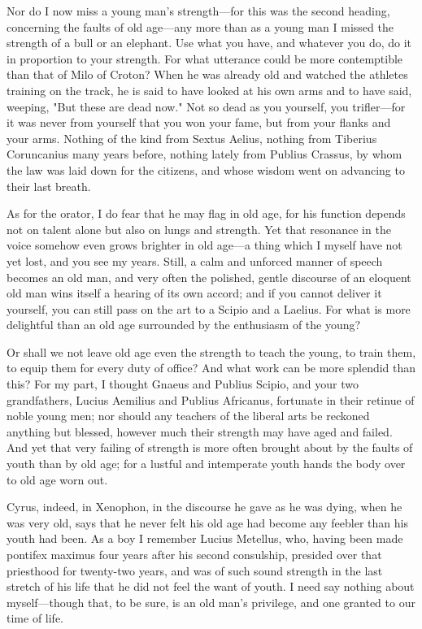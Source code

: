  Nor do I now miss a young man's strength—for this was the second heading, concerning the faults of old age—any more than as a young man I missed the strength of a bull or an elephant. Use what you have, and whatever you do, do it in proportion to your strength. For what utterance could be more contemptible than that of Milo of Croton? When he was already old and watched the athletes training on the track, he is said to have looked at his own arms and to have said, weeping, "But these are dead now." Not so dead as you yourself, you trifler—for it was never from yourself that you won your fame, but from your flanks and your arms. Nothing of the kind from Sextus Aelius, nothing from Tiberius Coruncanius many years before, nothing lately from Publius Crassus, by whom the law was laid down for the citizens, and whose wisdom went on advancing to their last breath.

 As for the orator, I do fear that he may flag in old age, for his function depends not on talent alone but also on lungs and strength. Yet that resonance in the voice somehow even grows brighter in old age—a thing which I myself have not yet lost, and you see my years. Still, a calm and unforced manner of speech becomes an old man, and very often the polished, gentle discourse of an eloquent old man wins itself a hearing of its own accord; and if you cannot deliver it yourself, you can still pass on the art to a Scipio and a Laelius. For what is more delightful than an old age surrounded by the enthusiasm of the young?

 Or shall we not leave old age even the strength to teach the young, to train them, to equip them for every duty of office? And what work can be more splendid than this? For my part, I thought Gnaeus and Publius Scipio, and your two grandfathers, Lucius Aemilius and Publius Africanus, fortunate in their retinue of noble young men; nor should any teachers of the liberal arts be reckoned anything but blessed, however much their strength may have aged and failed. And yet that very failing of strength is more often brought about by the faults of youth than by old age; for a lustful and intemperate youth hands the body over to old age worn out.

 Cyrus, indeed, in Xenophon, in the discourse he gave as he was dying, when he was very old, says that he never felt his old age had become any feebler than his youth had been. As a boy I remember Lucius Metellus, who, having been made pontifex maximus four years after his second consulship, presided over that priesthood for twenty-two years, and was of such sound strength in the last stretch of his life that he did not feel the want of youth. I need say nothing about myself—though that, to be sure, is an old man's privilege, and one granted to our time of life.

